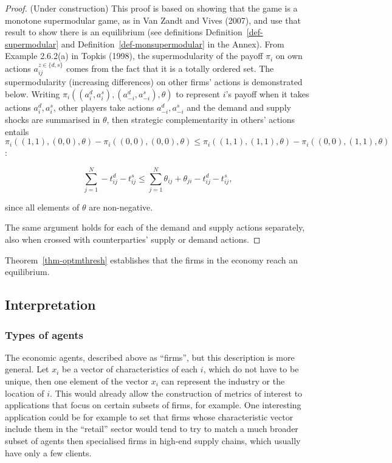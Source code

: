 \documentclass[
]{article}
\theoremstyle{plain}
\theoremstyle{definition}
\theoremstyle{remark}
\begin{document}
\begin{proof}
(Under construction) This proof is based on showing that the game is a
monotone supermodular game, as in Van Zandt and Vives (2007), and use
that result to show there is an equilibrium (see definitions
Definition~\ref{def-supermodular} and
Definition~\ref{def-monsupermodular} in the Annex). From Example
2.6.2(a) in Topkis (1998), the supermodularity of the payoff \(\pi_i\)
on own actions \(a_{ij}^{z \in \{d, s\}}\) comes from the fact that it
is a totally ordered set. The supermodularity (increasing differences)
on other firms' actions is demonstrated below. Writing
\(\pi_i((a_i^d, a_i^s),(a_{-i}^d, a_{-i}^s), \theta)\) to represent
\(i\)'s payoff when it takes actions \(a_i^d, a_i^s\), other players
take actions \(a_{-i}^d, a_{-i}^s\) and the demand and supply shocks are
summarised in \(\theta\), then strategic complementarity in others'
actions entails
\(\pi_i((1,1), (0,0), \theta) - \pi_i((0,0), (0,0), \theta) \leq \pi_i((1,1), (1,1), \theta) - \pi_i((0,0), (1,1), \theta)\):

\[
\sum_{j=1}^N -t_{ij}^d -t_{ij}^s \leq \sum_{j=1}^N \theta_{ij} + \theta_{ji} - t_{ij}^d - t_{ij}^s,
\]

since all elements of \(\theta\) are non-negative.

The same argument holds for each of the demand and supply actions
separately, also when crossed with counterparties' supply or demand
actions.
\end{proof}

Theorem~\ref{thm-optmthresh} establishes that the firms in the economy
reach an equilibrium.

\subsection{Interpretation}\label{sec-interpretation}

\subsubsection{Types of agents}\label{types-of-agents}

The economic agents, described above as ``firms'', but this description
is more general. Let \(x_i\) be a vector of characteristics of each
\(i\), which do not have to be unique, then one element of the vector
\(x_i\) can represent the industry or the location of \(i\). This would
already allow the construction of metrics of interest to applications
that focus on certain subsets of firms, for example. One interesting
application could be for example to set that firms whose characteristic
vector include them in the ``retail'' sector would tend to try to match
a much broader subset of agents then specialised firms in high-end
supply chains, which usually have only a few clients.
\end{document}
